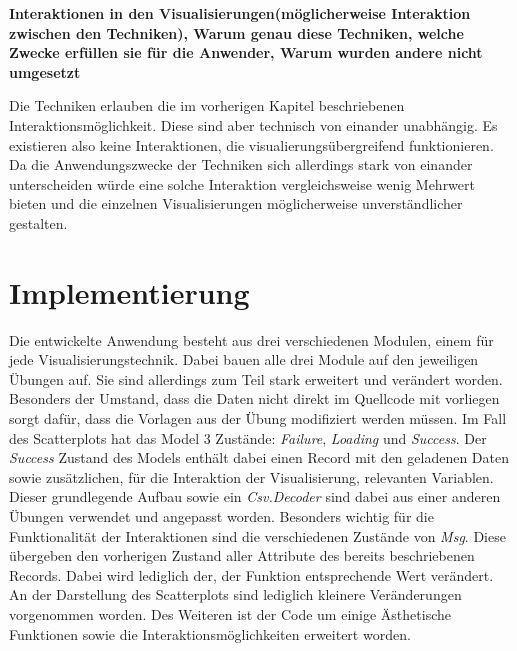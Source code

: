 \documentclass[usegeometry=true]{scrartcl}
\begin{document}
\textbf{Interaktionen in den Visualisierungen(möglicherweise Interaktion zwischen den Techniken), Warum genau diese Techniken, welche Zwecke erfüllen sie für die Anwender, Warum wurden andere nicht umgesetzt}

Die Techniken erlauben die im vorherigen Kapitel beschriebenen Interaktionsmöglichkeit. Diese sind aber technisch von einander unabhängig. Es existieren also keine Interaktionen, die visualierungsübergreifend funktionieren. Da die Anwendungszwecke der Techniken sich allerdings stark von einander unterscheiden würde eine solche Interaktion vergleichsweise wenig Mehrwert bieten und die einzelnen Visualisierungen möglicherweise unverständlicher gestalten. 

\section{Implementierung}

Die entwickelte Anwendung besteht aus drei verschiedenen Modulen, einem für jede Visualisierungstechnik. Dabei bauen alle drei Module auf den jeweiligen Übungen auf. Sie sind allerdings zum Teil stark erweitert und verändert worden.
Besonders der Umstand, dass die Daten nicht direkt im Quellcode mit vorliegen sorgt dafür, dass die Vorlagen aus der Übung modifiziert werden müssen.
Im Fall des Scatterplots hat das Model 3 Zustände: \textit{Failure}, \textit{Loading} und \textit{Success}. Der \textit{Success} Zustand des Models enthält dabei einen Record mit den geladenen Daten sowie zusätzlichen, für die Interaktion der Visualisierung, relevanten Variablen. Dieser grundlegende Aufbau sowie ein \textit{Csv.Decoder} sind dabei aus einer anderen Übungen verwendet und angepasst worden.
Besonders wichtig für die Funktionalität der Interaktionen sind die verschiedenen Zustände von \textit{Msg}. Diese übergeben den vorherigen Zustand aller Attribute des bereits beschriebenen Records. Dabei wird lediglich der, der Funktion entsprechende Wert verändert. An der Darstellung des Scatterplots sind lediglich kleinere Veränderungen vorgenommen worden. Des Weiteren ist der Code um einige Ästhetische Funktionen sowie die Interaktionsmöglichkeiten erweitert worden.\\
\end{document}
